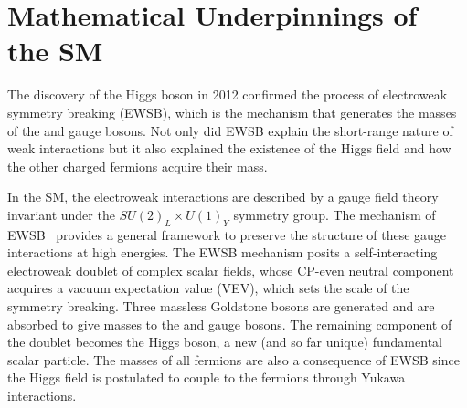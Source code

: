 \section{Mathematical Underpinnings of the SM}
\label{sec:sm_math}


The discovery of the Higgs boson in 2012 confirmed the process of electroweak symmetry breaking (EWSB), which is the mechanism that generates the masses of the \PWpm and \PZ gauge bosons.
Not only did EWSB explain the short-range nature of weak interactions but it also explained the existence of the Higgs field and how the other charged fermions acquire their mass.

In the SM, the electroweak interactions are described by a gauge field theory invariant under the $SU(2)_L \times U(1)_Y$ symmetry group.
The mechanism of EWSB~\cite{PhysRevD.2.1285, PhysRevLett.13.321, PhysRev.145.1156} provides a general framework to preserve the structure of these gauge interactions at high energies.
The EWSB mechanism posits a self-interacting electroweak doublet of complex scalar fields, whose CP-even neutral component acquires a vacuum expectation value (VEV), which sets the scale of the symmetry breaking.
Three massless Goldstone bosons are generated and are absorbed to give masses to the \PW and \PZ gauge bosons.
The remaining component of the doublet becomes the Higgs boson, a new (and so far unique) fundamental scalar particle.
The masses of all fermions are also a consequence of EWSB since the Higgs field is postulated to couple to the fermions through Yukawa interactions.

